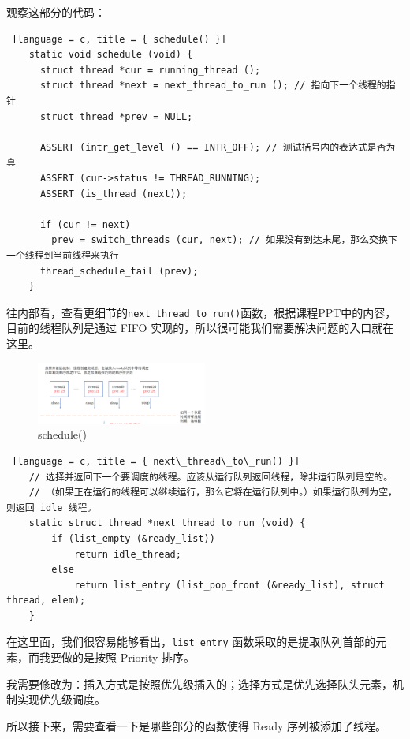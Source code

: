 观察这部分的代码：

\begin{lstlisting} [language = c, title = { schedule() }]
    static void schedule (void) {
      struct thread *cur = running_thread ();
      struct thread *next = next_thread_to_run (); // 指向下一个线程的指针
      struct thread *prev = NULL;
    
      ASSERT (intr_get_level () == INTR_OFF); // 测试括号内的表达式是否为真
      ASSERT (cur->status != THREAD_RUNNING);
      ASSERT (is_thread (next));
    
      if (cur != next)
        prev = switch_threads (cur, next); // 如果没有到达末尾，那么交换下一个线程到当前线程来执行
      thread_schedule_tail (prev);
    }    
\end{lstlisting}

往内部看，查看更细节的\texttt{next\_thread\_to\_run()}函数，根据课程PPT中的内容，目前的线程队列是通过 FIFO 实现的，所以很可能我们需要解决问题的入口就在这里。

\begin{figure} [H]
    \centering
    \includegraphics[width=0.5\textwidth]{img3/class.png}
    \caption{schedule()}
    \label{fig:schedule}
\end{figure}

\begin{lstlisting} [language = c, title = { next\_thread\_to\_run() }]
    // 选择并返回下一个要调度的线程。应该从运行队列返回线程，除非运行队列是空的。
    // （如果正在运行的线程可以继续运行，那么它将在运行队列中。）如果运行队列为空，则返回 idle 线程。
    static struct thread *next_thread_to_run (void) {
        if (list_empty (&ready_list))
            return idle_thread;
        else
            return list_entry (list_pop_front (&ready_list), struct thread, elem);
    }
\end{lstlisting}

在这里面，我们很容易能够看出，\texttt{list\_entry} 函数采取的是提取队列首部的元素，而我要做的是按照 Priority 排序。

我需要修改为：插入方式是按照优先级插入的；选择方式是优先选择队头元素，机制实现优先级调度。

所以接下来，需要查看一下是哪些部分的函数使得 Ready 序列被添加了线程。

